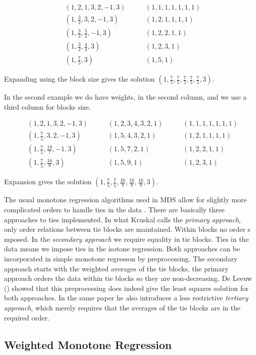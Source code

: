\documentclass[
  12pt,
  letterpaper,
  DIV=11,
  numbers=noendperiod]{scrreprt}
\theoremstyle{remark}
\begin{document}
\begin{align}
&(1,2,1,3,2,-1,3) \qquad &(1,1,1,1,1,1,1)\\
&(1,\frac32,3,2,-1,3) \qquad &(1,2,1,1,1,1)\\
&(1,\frac32,\frac52,-1,3) \qquad &(1,2,2,1,1)\\
&(1,\frac32,\frac43,3) \qquad &(1,2,3,1)\\
&(1,\frac75,3) \qquad &(1,5,1)
\end{align}

Expanding using the block size gives the solution
\((1,\frac75,\frac75,\frac75,\frac75,\frac75,3)\).

In the second example we do have weights, in the second column, and we
use a third column for blocks size.

\begin{align}
&(1,2,1,3,2,-1,3) \qquad &(1,2,3,4,3,2,1) \qquad &(1,1,1,1,1,1,1)\\
&(1,\frac75,3,2,-1,3) \qquad &(1,5,4,3,2,1) \qquad &(1,2,1,1,1,1)\\
&(1,\frac75,\frac{18}{7},-1,3) \qquad &(1,5,7,2,1) \qquad &(1,2,2,1,1)\\
&(1,\frac75,\frac{16}{9},3) \qquad &(1,5,9,1) \qquad &(1,2,3,1)
\end{align}

Expansion gives the solution
\((1,\frac75,\frac75,\frac{16}{9},\frac{16}{9},\frac{16}{9},3)\).

The usual monotone regression algorithms used in MDS allow for slightly
more complicated orders to handle ties in the data . There are basically
three approaches to ties implemented. In what Kruskal calls the
\emph{primary approach}, only order relations between tie blocks are
maintained. Within blocks no order s mposed. In the \emph{secondary
approach} we require equality in tie blocks. Ties in the data means we
impose ties in the isotone regression. Both approaches can be
incorporated in simple monotone regresson by preprocessing. The
secondary approach starts with the weighted averages of the tie blocks,
the primary approach orders the data within tie blocks so they are
non-decreasing. De Leeuw () showed
that this preprocessing does indeed give the least squares solution for
both approaches. In the same paper he also introduces a less restrictive
\emph{tertiary approach}, which merely requires that the averages of the
tie blocks are in the required order.

\subsection{Weighted Monotone Regression}\label{mathweigmr}
\end{document}
